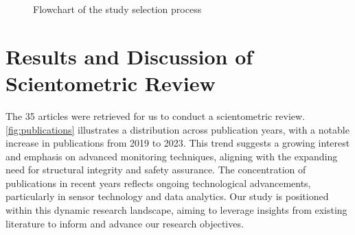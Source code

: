 \documentclass[journal, a4paper]{IEEEtran}
\begin{document}
\begin{figure}[htbp]
    \centering
{}
\caption{Flowchart of the study selection process}
\label{fig:flowchartFilter}
\end{figure}





\section{Results and Discussion of Scientometric Review}
The 35 articles were retrieved for us to conduct a scientometric review.
\autoref{fig:publications} illustrates a distribution across publication years,
with a notable increase in publications from 2019 to 2023.
This trend suggests a growing interest and emphasis on advanced monitoring techniques,
aligning with the expanding need for structural integrity and safety assurance.
The concentration of publications in recent years reflects ongoing technological advancements,
particularly in sensor technology and data analytics.
Our study is positioned within this dynamic research landscape, aiming to leverage insights from existing
literature to inform and advance our research objectives.
\end{document}
